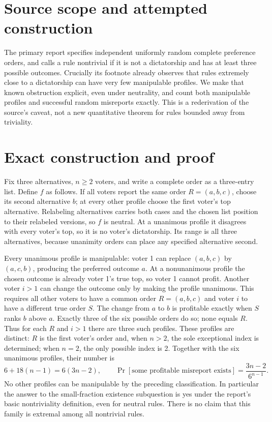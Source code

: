 \documentclass[11pt]{article}
\begin{document}
\section{Source scope and attempted construction}
The primary report specifies independent uniformly random complete preference
orders, and calls a rule nontrivial if it is not a dictatorship and has at
least three possible outcomes. Crucially its footnote already observes that
rules extremely close to a dictatorship can have very few manipulable profiles.
We make that known obstruction explicit, even under neutrality, and count
both manipulable profiles and successful random misreports exactly. This is
a rederivation of the source's caveat, not a new quantitative theorem for
rules bounded away from triviality.

\section{Exact construction and proof}
Fix three alternatives, $n\ge2$ voters, and write a complete order as a
three-entry list. Define $f$ as follows. If all voters report the same order
$R=(a,b,c)$, choose its second alternative $b$; at every other profile choose
the first voter's top alternative. Relabeling alternatives carries both cases
and the chosen list position to their relabeled versions, so $f$ is neutral.
At a unanimous profile it disagrees with every voter's top, so it is no
voter's dictatorship. Its range is all three alternatives, because unanimity
orders can place any specified alternative second.

Every unanimous profile is manipulable: voter 1 can replace $(a,b,c)$ by
$(a,c,b)$, producing the preferred outcome $a$. At a nonunanimous profile
the chosen outcome is already voter 1's true top, so voter 1 cannot profit.
Another voter $i>1$ can change the outcome only by making the profile
unanimous. This requires all other voters to have a common order
$R=(a,b,c)$ and voter $i$ to have a different true order $S$. The change
from $a$ to $b$ is profitable exactly when $S$ ranks $b$ above $a$.
Exactly three of the six possible orders do so; none equals $R$.
Thus for each $R$ and $i>1$ there are three such profiles. These profiles
are distinct: $R$ is the first voter's order and, when $n>2$, the sole
exceptional index is determined; when $n=2$, the only possible index is 2.
Together with the six unanimous profiles, their number is
\[
6+18(n-1)=6(3n-2),\qquad
\Pr[\text{some profitable misreport exists}]=\frac{3n-2}{6^{n-1}}.
\]
No other profiles can be manipulable by the preceding classification.
In particular the answer to the small-fraction existence subquestion is yes
under the report's basic nontriviality definition, even for neutral rules.
There is no claim that this family is extremal among all nontrivial rules.
\end{document}
